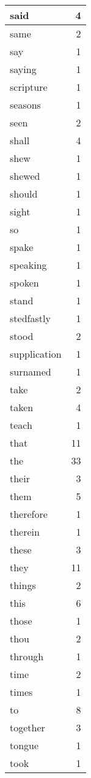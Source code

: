 \begin{center}
\begin{longtable}{l|r}
said & 4 \\ \hline
same & 2 \\ \hline
say & 1 \\ \hline
saying & 1 \\ \hline
scripture & 1 \\ \hline
seasons & 1 \\ \hline
seen & 2 \\ \hline
shall & 4 \\ \hline
shew & 1 \\ \hline
shewed & 1 \\ \hline
should & 1 \\ \hline
sight & 1 \\ \hline
so & 1 \\ \hline
spake & 1 \\ \hline
speaking & 1 \\ \hline
spoken & 1 \\ \hline
stand & 1 \\ \hline
stedfastly & 1 \\ \hline
stood & 2 \\ \hline
supplication & 1 \\ \hline
surnamed & 1 \\ \hline
take & 2 \\ \hline
taken & 4 \\ \hline
teach & 1 \\ \hline
that & 11 \\ \hline
the & 33 \\ \hline
their & 3 \\ \hline
them & 5 \\ \hline
therefore & 1 \\ \hline
therein & 1 \\ \hline
these & 3 \\ \hline
they & 11 \\ \hline
things & 2 \\ \hline
this & 6 \\ \hline
those & 1 \\ \hline
thou & 2 \\ \hline
through & 1 \\ \hline
time & 2 \\ \hline
times & 1 \\ \hline
to & 8 \\ \hline
together & 3 \\ \hline
tongue & 1 \\ \hline
took & 1 \\ \hline

\end{longtable}
\end{center}
